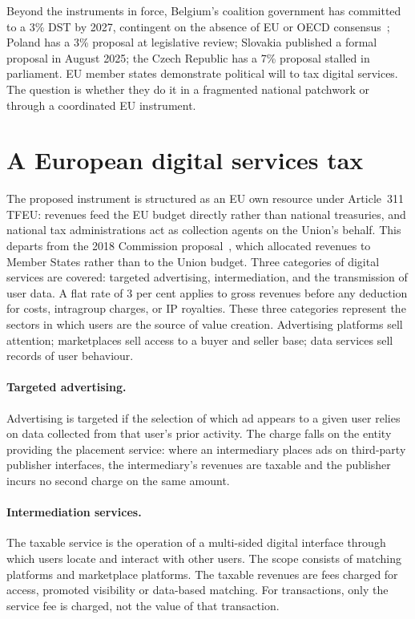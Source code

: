 \documentclass[../../main]{subfiles}
\begin{document}
Beyond the instruments in force, Belgium's coalition government has committed to a 3\% DST by 2027, contingent on the absence of EU or OECD consensus~\citep{ceps_april2025}; Poland has a 3\% proposal at legislative review; Slovakia published a formal proposal in August 2025; the Czech Republic has a 7\% proposal stalled in parliament.
EU member states demonstrate political will to tax digital services.
The question is whether they do it in a fragmented national patchwork or through a coordinated EU instrument.

\section{A European digital services tax}
The proposed instrument is structured as an EU own resource under Article~311 TFEU: revenues feed the EU budget directly rather than national treasuries, and national tax administrations act as collection agents on the Union's behalf.
This departs from the 2018 Commission proposal~\citep{eu_commission_proposal}, which allocated revenues to Member States rather than to the Union budget.
Three categories of digital services are covered: targeted advertising, intermediation, and the transmission of user data.
A flat rate of 3 per cent applies to gross revenues before any deduction for costs, intragroup charges, or IP royalties.
These three categories represent the sectors in which users are the source of value creation. Advertising platforms sell attention; marketplaces sell access to a buyer and seller base; data services sell records of user behaviour.

\paragraph{Targeted advertising.}
Advertising is targeted if the selection of which ad appears to a given user relies on data collected from that user's prior activity.
The charge falls on the entity providing the placement service: where an intermediary places ads on third-party publisher interfaces, the intermediary's revenues are taxable and the publisher incurs no second charge on the same amount.

\paragraph{Intermediation services.}
The taxable service is the operation of a multi-sided digital interface through which users locate and interact with other users.
The scope consists of matching platforms and marketplace platforms.
The taxable revenues are fees charged for access, promoted visibility or data-based matching.
For transactions, only the service fee is charged, not the value of that transaction.
\end{document}
